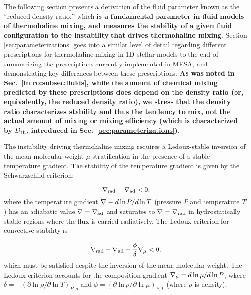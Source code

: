 The following section presents a derivation of the fluid parameter known as the ``reduced density ratio,'' which \textbf{is a fundamental parameter in fluid models of thermohaline mixing, and measures the stability of a given fluid configuration to the instability that drives thermohaline mixing}. 
Section \ref{sec:parameterizations} goes into a similar level of detail regarding different prescriptions for thermohaline mixing in 1D stellar models 
to the end of summarizing the prescriptions currently implemented in MESA, and demonstrating key differences between these prescriptions. \textbf{As was noted in Sec.~\ref{intro:subsec:fluids}, while the amount of chemical mixing predicted by these prescriptions does depend on the density ratio (or, equivalently, the reduced density ratio), we stress that the density ratio characterizes stability and thus the tendency to mix, not the actual amount of mixing or mixing efficiency (which is characterized by $D_\mathrm{th}$, introduced in Sec.~\ref{sec:parameterizations}).}


%
The instability driving thermohaline mixing requires a Ledoux-stable inversion of the mean molecular weight $\mu$ stratification in the presence of a stable temperature gradient. 
The stability of the temperature gradient is given by the Schwarzschild criterion:

\begin{equation} \label{eq:Schwarzschild}
    \gradrad - \gradad < 0,
\end{equation}
where the temperature gradient $\nabla \equiv d \ln P / d \ln T$ (pressure $P$ and temperature $T$) has an adiabatic value $\nabla = \nabla_{\rm{ad}}$ and saturates to $\nabla = \nabla_{\rm{rad}}$ in hydrostatically stable regions where the flux is carried radiatively. 
The Ledoux criterion for convective stability is \citep{Ledoux1947}

\begin{equation} \label{eq:Ledoux}
    \gradrad - \gradad - \frac{\phi}{\delta}\gradmu < 0,
\end{equation}
which must be satisfied despite the inversion of the mean molecular weight.
The Ledoux criterion accounts for the composition gradient $\nabla_{\mu} = d\ln\mu/d\ln P$, where $\delta = -(\partial \ln \rho / \partial \ln T)_{P,\mu}$ and $\phi = (\partial \ln \rho / \partial \ln\mu)_{P,T}$ (where $\rho$ is density).


